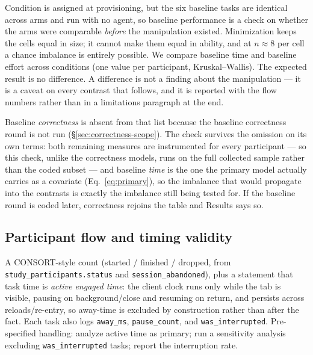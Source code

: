 \documentclass[11pt]{article}
\newcommand{\code}[1]{\texttt{#1}}
\begin{document}
Condition is assigned at provisioning, but the six baseline tasks are identical
across arms and run with no agent, so baseline performance is a check on whether
the arms were comparable \emph{before} the manipulation existed. Minimization
keeps the cells equal in size; it cannot make them equal in ability, and at
$n \approx 8$ per cell a chance imbalance is entirely possible. We compare
baseline time and baseline effort across conditions (one value per participant,
Kruskal--Wallis). The expected result is no
difference. A difference is not a finding about the manipulation --- it is a
caveat on every contrast that follows, and it is reported with the flow numbers
rather than in a limitations paragraph at the end.

Baseline \emph{correctness} is absent from that list because the baseline
correctness round is not run (\S\ref{sec:correctness-scope}). The check survives
the omission on its own terms: both remaining measures are instrumented for every
participant --- so this check, unlike the correctness models, runs on the full
collected sample rather than the coded subset --- and baseline \emph{time} is the
one the primary model actually carries as a covariate
(Eq.~\eqref{eq:primary}), so the imbalance that would propagate into the
contrasts is exactly the imbalance still being tested for. If the baseline round
is coded later, correctness rejoins the table and Results says so.

\subsection{Participant flow and timing validity}\label{sec:timing}
A CONSORT-style count (started / finished / dropped, from
\code{study\_participants.status} and \code{session\_abandoned}), plus a statement
that task time is \emph{active engaged time}: the client clock runs only while
the tab is visible, pausing on background/close and resuming on return, and
persists across reloads/re-entry, so away-time is excluded by construction rather
than after the fact. Each task also logs \code{away\_ms}, \code{pause\_count},
and \code{was\_interrupted}. Pre-specified handling: analyze active time as
primary; run a sensitivity analysis excluding \code{was\_interrupted} tasks;
report the interruption rate.
\end{document}
